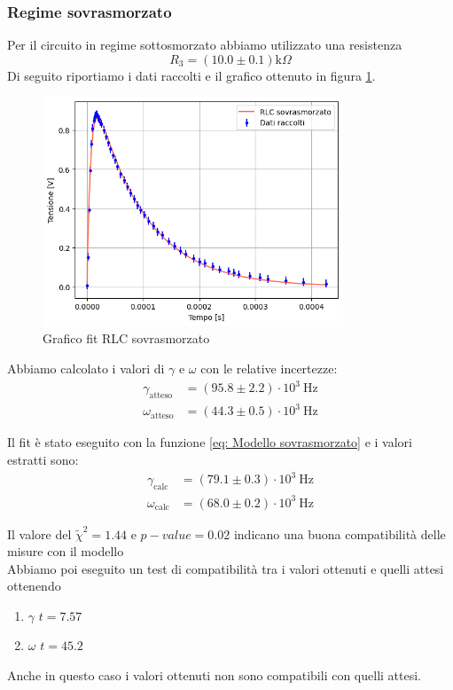 \documentclass[letterpaper,12pt]{article}
\begin{document}
\newpage
\subsubsection{Regime sovrasmorzato}
Per il circuito in regime sottosmorzato abbiamo utilizzato una resistenza $$R_3 =(10.0\pm0.1)\text{k}\Omega $$
Di seguito riportiamo i dati raccolti e il grafico ottenuto in figura \ref{fig:fitRLCsovra}.

\begin{figure}[h!]
	\centering
	\includegraphics[width=0.8\textwidth]{RLCsovra.png}
	\caption{Grafico fit RLC sovrasmorzato}
	\label{fig:fitRLCsovra}
\end{figure}

Abbiamo calcolato i valori di $\gamma$ e $\omega$ con le relative incertezze:
\begin{align*}
	\gamma_\text{atteso} & = (95.8 \pm 2.2) \cdot 10^3\ \text{Hz} \\
	\omega_\text{atteso} & = (44.3 \pm 0.5) \cdot 10^3\ \text{Hz}
\end{align*}

Il fit è stato eseguito con la funzione \eqref{eq: Modello sovrasmorzato} e i valori estratti sono:
\begin{align*}
	\gamma_\text{calc} & = (79.1 \pm 0.3) \cdot 10^3\ \text{Hz} \\
	\omega_\text{calc} & = (68.0 \pm 0.2) \cdot 10^3\ \text{Hz}
\end{align*}

Il valore del $\widetilde{\chi}^2 = 1.44$ e $p-value = 0.02$ indicano una buona compatibilità delle misure con il modello\\

Abbiamo poi eseguito un test di compatibilità tra i valori ottenuti e quelli attesi ottenendo
\begin{enumerate}
	\item $\gamma$ \quad  $t = 7.57$
    \item $\omega$ \quad $t = 45.2$
\end{enumerate}
Anche in questo caso i valori ottenuti non sono compatibili con quelli attesi.\\
\end{document}
